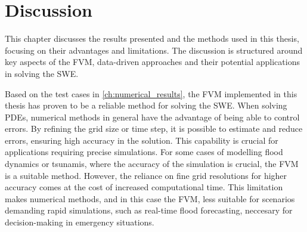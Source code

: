 \chapter{Discussion}\label{ch:discussion}
This chapter discusses the results presented and the methods used in this thesis, focusing on their advantages and limitations.
The discussion is structured around key aspects of the FVM, data-driven approaches and their potential applications in solving the SWE.

Based on the test cases in \autoref{ch:numerical_results}, the FVM implemented in this thesis has proven to be a reliable method for solving the SWE.
When solving PDEs, numerical methods in general have the advantage of being able to control errors.
By refining the grid size or time step, it is possible to estimate and reduce errors, ensuring high accuracy in the solution.
This capability is crucial for applications requiring precise simulations.
For some cases of modelling flood dynamics or tsunamis, where the accuracy of the simulation is crucial, the FVM is a suitable method.
However, the reliance on fine grid resolutions for higher accuracy comes at the cost of increased computational time.
This limitation makes numerical methods, and in this case the FVM, less suitable for scenarios demanding rapid simulations, such as real-time flood forecasting, neccesary for decision-making in emergency situations.

